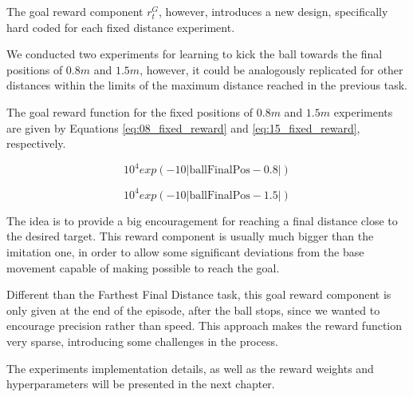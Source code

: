 The goal reward component $r^G_t$, however, introduces a new design, specifically hard coded for each fixed distance experiment.

We conducted two experiments for learning to kick the ball towards the final positions of $0.8m$ and $1.5m$, however, it could be analogously replicated for other distances within the limits of the maximum distance reached in the previous task.

The goal reward function for the fixed positions of $0.8m$ and $1.5m$ experiments are given by Equations \eqref{eq:08_fixed_reward} and \eqref{eq:15_fixed_reward}, respectively.

\begin{equation}
10^4 exp \left( -10 |\text{ballFinalPos}-0.8| \right)
\label{eq:08_fixed_reward}
\end{equation}

\begin{equation}
10^4 exp \left( -10 |\text{ballFinalPos}-1.5| \right)
\label{eq:15_fixed_reward}
\end{equation}

The idea is to provide a big encouragement for reaching a final distance close to the desired target. This reward component is usually much bigger than the imitation one, in order to allow some significant deviations from the base movement capable of making possible to reach the goal.

Different than the Farthest Final Distance task, this goal reward component is only given at the end of the episode, after the ball stops, since we wanted to encourage precision rather than speed. This approach makes the reward function very sparse, introducing some challenges in the process.

The experiments implementation details, as well as the reward weights and hyperparameters will be presented in the next chapter.






